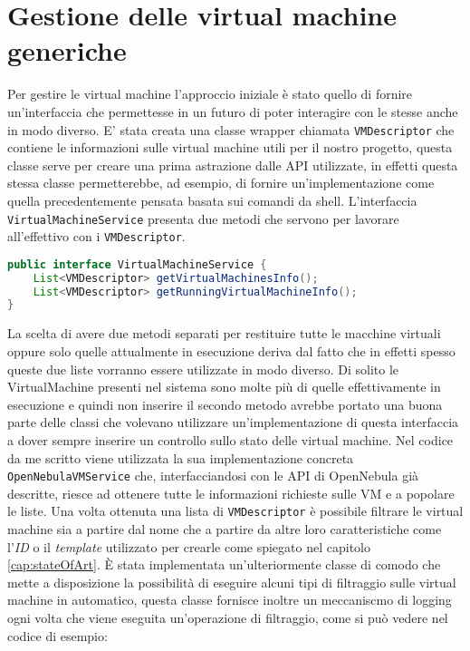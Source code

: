 \section{Gestione delle virtual machine generiche}
Per gestire le virtual machine l'approccio iniziale è stato quello di fornire un'interfaccia che permettesse in un futuro di poter interagire con le stesse anche in modo diverso.
E' stata creata una classe wrapper chiamata \texttt{VMDescriptor} che contiene le informazioni sulle virtual machine utili per il nostro progetto, questa classe serve per creare una prima astrazione dalle API utilizzate, in effetti questa stessa classe permetterebbe, ad esempio, di fornire un'implementazione come quella precedentemente pensata basata sui comandi da shell.
L'interfaccia \texttt{VirtualMachineService} presenta due metodi che servono per lavorare all'effettivo con i \texttt{VMDescriptor}.
\begin{lstlisting}[language=Java, caption=VirtualMachineService, label=code:VirtualMachineService, xleftmargin=1em]
public interface VirtualMachineService {
    List<VMDescriptor> getVirtualMachinesInfo();
    List<VMDescriptor> getRunningVirtualMachineInfo();
}
\end{lstlisting}
La scelta di avere due metodi separati per restituire tutte le macchine virtuali oppure solo quelle attualmente in esecuzione deriva dal fatto che in effetti spesso queste due liste vorranno essere utilizzate in modo diverso. Di solito le VirtualMachine presenti nel sistema sono molte più di quelle effettivamente in esecuzione e quindi non inserire il secondo metodo avrebbe portato una buona parte delle classi che volevano utilizzare un'implementazione di questa interfaccia a dover sempre inserire un controllo sullo stato delle virtual machine.
Nel codice da me scritto viene utilizzata la sua implementazione concreta \texttt{OpenNebulaVMService} che, interfacciandosi con le API di OpenNebula già descritte, riesce ad ottenere tutte le informazioni richieste sulle VM e a popolare le liste.
Una volta ottenuta una lista di \texttt{VMDescriptor} è possibile filtrare le virtual machine sia a partire dal nome che a partire da altre loro caratteristiche come l'\emph{ID} o il \emph{template} utilizzato per crearle come spiegato nel capitolo \ref{cap:stateOfArt}.
È stata implementata un'ulteriormente classe di comodo che mette a disposizione la possibilità di eseguire alcuni tipi di filtraggio sulle virtual machine in automatico, questa classe fornisce inoltre un meccaniscmo di logging ogni volta che viene eseguita un'operazione di filtraggio, come si può vedere nel codice di esempio:
